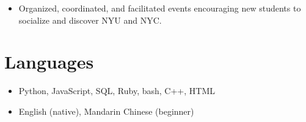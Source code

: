 \documentclass{cultvoucher}
\begin{document}
\begin{itemize}
	\item Organized, coordinated, and facilitated events encouraging new students to socialize and discover NYU and NYC.
\end{itemize}

\section{Languages}
\begin{itemize}
	\item Python, JavaScript, SQL, Ruby, bash, C++, HTML
	\item English (native), Mandarin Chinese (beginner)
\end{itemize}
\end{document}
